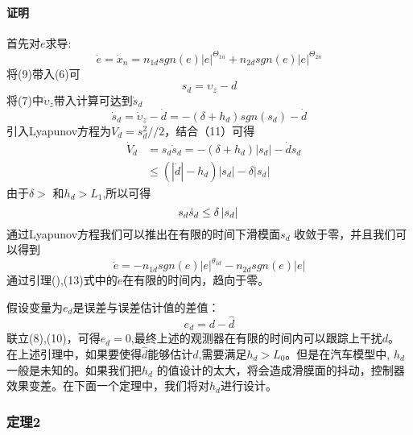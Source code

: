 \documentclass{cjc}
\begin{document}
  \paragraph*{证明}
    首先对$e$求导:
    \begin{equation}
      \dot{e} = \dot{x}_n =  n_{1d} sgn(e) \left| e \right|^{\varTheta_{1n}} + n_{2d} sgn(e)\left|e\right|^{\varTheta_{2n}} 
    \end{equation}
    将(9)带入(6)可\:
    \begin{equation}
      s_d = \upsilon _z -d
    \end{equation}
    将(7)中$\dot{\upsilon }_z$带入计算可达到$\dot{s}_d$\:
    \begin{equation}
      \dot{s}_d = \dot{\upsilon }_z - \dot{d} = -(\delta + h_d)sgn(s_d) - \dot{d}
    \end{equation}
    引入Lyapunov方程为$V_d = s_d ^2 //2$，结合（11）可得\:
    \begin{eqnarray}
      &\dot{V}_d &= s_d \dot{s}_d = -(\delta + h_d)\left| s_d \right| - \dot{d}s_d \nonumber\\
      & &  \leq (\left| {\dot{d}} \right| -h_d)  \left| s_d \right| - \delta \left| s_d \right|
    \end{eqnarray}
    由于$\delta>$ 和$h_d>L_1$,所以可得\:
    \begin{equation*}
      s_d \dot{s}_d \leq \delta \left| s_d \right| \\    
    \end{equation*}
    通过Lyapunov方程我们可以推出在有限的时间下滑模面$s_d$ 收敛于零，并且我们可以得到\:
    \begin{equation}
      \dot{e} = - n_{1d}sgn(e)\left| e\right|^{\theta_{1d}} - n_{2d}sgn(e)  \left| e\right|
    \end{equation}
    通过引理(),(13)式中的$\dot{e}$在有限的时间内，趋向于零。

    假设变量为$e_d$是误差与误差估计值的差值：
    \begin{equation}
      e_d = d - \hat{d}
    \end{equation}
    联立(8),(10)，可得$e_d = 0$,最终上述的观测器在有限的时间内可以跟踪上干扰$d$。 \\
    在上述引理中，如果要使得$\hat{d}$能够估计$d$,需要满足$h_d > L_0$。但是在汽车模型中, $h_d$一般是未知的。如果我们把$h_d$
    的值设计的太大，将会造成滑膜面的抖动，控制器效果变差。在下面一个定理中，我们将对$h_d$进行设计。
    
  \subsubsection{定理2}
\end{document}
